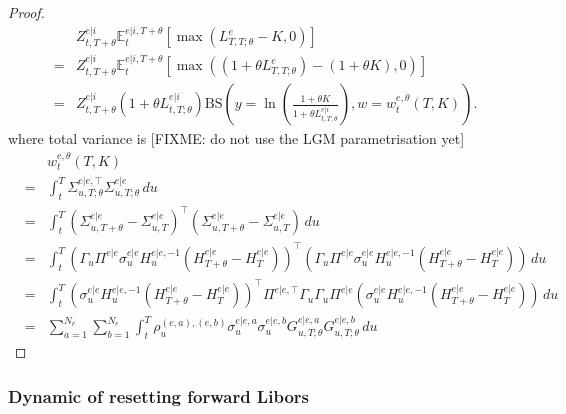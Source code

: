 \documentclass[11pt,english]{amsart}
\newcommand{\BS}{\mathrm{BS}}
\newcommand{\EE}{\mathbb{E}}
\theoremstyle{definition}
\begin{document}
\begin{proof}
\begin{eqnarray*}
  & & Z^{e|i}_{t,T+\theta}\EE^{e|i,T+\theta}_t\left[\max\left(L^{e}_{T,T;\theta}-K,0\right)\right]  \nonumber \\
  &=& Z^{e|i}_{t,T+\theta}\EE^{e|i,T+\theta}_t\left[\max\left((1+\theta L^{e}_{T,T;\theta}) - (1+\theta K),0\right)\right]  \\
  &=& Z^{e|i}_{t,T+\theta} \left( 1+\theta L^{e|i}_{t,T;\theta} \right)\BS\left(y = \ln \left( \tfrac{1+\theta K}{ 1+\theta L^{e|i}_{t,T;\theta} } \right), w = w^{e,\theta}_t(T,K) \right) .
\end{eqnarray*}  
where total variance is [FIXME: do not use the LGM parametrisation yet]
\begin{eqnarray*}
  & & w^{e,\theta}_t(T,K) \\
  &=&   \int_t^T  \Sigma^{e|e,\top}_{u,T;\theta}  \Sigma^{e|e}_{u,T;\theta} \, du \\
  &=&   \int_t^T  \left(\Sigma^{e|e}_{u,T+\theta} - \Sigma^{e|e}_{u,T}\right)^\top  \left(\Sigma^{e|e}_{u,T+\theta}  - \Sigma^{e|e}_{u,T}\right) \, du \\
  &=&   \int_t^T  \left(\Gamma_u \Pi^{e|e}\sigma^{e|e}_{u}H^{e|e,-1}_u(H^{e|e}_{T+\theta} - H^{e|e}_{T})\right)^\top \left(\Gamma_u \Pi^{e|e}\sigma^{e|e}_{u}H^{e|e,-1}_u(H^{e|e}_{T+\theta} - H^{e|e}_{T})\right) \, du \\
  &=&   \int_t^T  \left(\sigma^{e|e}_{u}H^{e|e,-1}_u(H^{e|e}_{T+\theta} - H^{e|e}_{T})\right)^\top \Pi^{e|e,\top} \Gamma_u \Gamma_u \Pi^{e|e} \left( \sigma^{e|e}_{u}H^{e|e,-1}_u(H^{e|e}_{T+\theta} - H^{e|e}_{T})\right) \, du \\
  &=&  \sum_{a=1}^{N_e}  \sum_{b=1}^{N_{e}} \int_t^T  \rho^{(e,a),(e,b)}_u \sigma^{e|e,a}_u \sigma^{e|e,b}_u  G^{e|e,a}_{u,T;\theta} G^{e|e,b}_{u,T;\theta} \, du  
\end{eqnarray*} 
\end{proof}







\subsubsection{Dynamic of resetting forward Libors}
\end{document}
